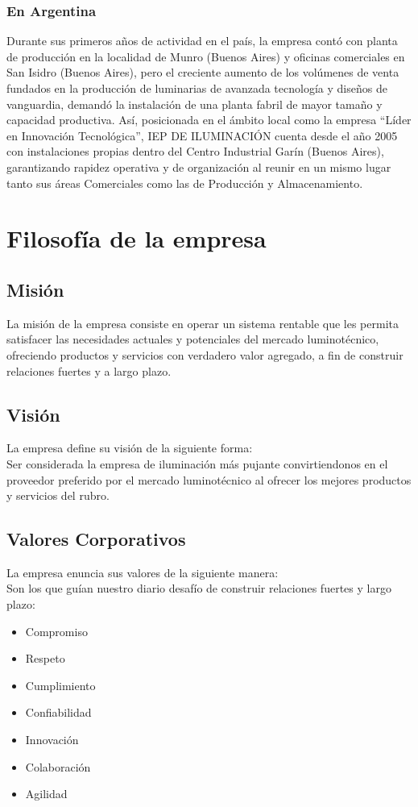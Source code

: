 \subsubsection{En Argentina}
Durante sus primeros años de actividad en el país, la empresa contó con planta de producción en la localidad de Munro (Buenos Aires) y oficinas comerciales en San Isidro (Buenos Aires), pero el creciente aumento de los volúmenes de venta fundados en la producción de luminarias de avanzada tecnología y diseños de vanguardia, demandó la instalación de una planta fabril de mayor tamaño y capacidad productiva.
Así, posicionada en el ámbito local como la empresa “Líder en Innovación Tecnológica”, IEP DE ILUMINACIÓN cuenta desde el año 2005 con instalaciones propias dentro del Centro Industrial Garín (Buenos Aires), garantizando rapidez operativa y de organización al reunir en un mismo lugar tanto sus áreas Comerciales como las de Producción y Almacenamiento.

\section{Filosof\'ia de la empresa}

\subsection{Misi\'on}

La misi\'on de la empresa consiste en operar un sistema rentable que les permita satisfacer las necesidades actuales y potenciales del mercado luminot\'ecnico, 
ofreciendo productos y servicios con verdadero valor agregado, a fin de construir relaciones fuertes y a largo plazo.

\subsection{Visi\'on}

La empresa define su visi\'on de la siguiente forma:\\
Ser considerada la empresa de iluminaci\'on m\'as pujante convirtiendonos en el proveedor preferido por el mercado luminot\'ecnico al ofrecer los mejores 
productos y servicios del rubro.
 
\subsection{Valores Corporativos}
La empresa enuncia sus valores de la siguiente manera: \\
Son los que guían nuestro diario desafío de construir relaciones fuertes y largo plazo:
\begin{itemize}
	\item Compromiso
	\item Respeto
	\item Cumplimiento
	\item Confiabilidad
	\item Innovación
	\item Colaboración
	\item Agilidad
\end{itemize}


